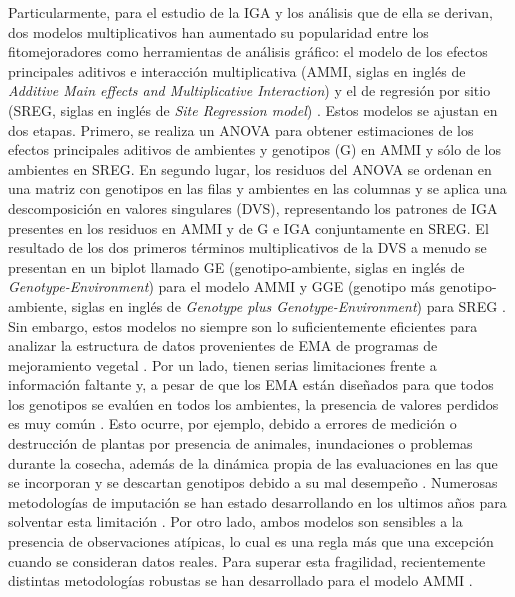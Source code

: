 Particularmente, para el estudio de la IGA y los análisis que de ella se derivan, dos modelos multiplicativos han aumentado su popularidad entre los fitomejoradores como herramientas de análisis gráfico: el modelo de los efectos principales aditivos e interacción multiplicativa (AMMI, siglas en inglés de \emph{Additive Main effects and Multiplicative Interaction}) \citep{Gauch1988, Gauch1992} y el de regresión por sitio (SREG, siglas en inglés de \emph{Site Regression model}) \citep{Corneliusetal1996, CrossaCornelius1997}. Estos modelos se ajustan en dos etapas. Primero, se realiza un ANOVA para obtener estimaciones de los efectos principales aditivos de ambientes y genotipos (G) en AMMI y sólo de los ambientes en SREG. En segundo lugar, los residuos del ANOVA se ordenan en una matriz con genotipos en las filas y ambientes en las columnas y se aplica una descomposición en valores singulares (DVS), representando los patrones de IGA presentes en los residuos en AMMI y de G e IGA conjuntamente en SREG. El resultado de los dos primeros términos multiplicativos de la DVS a menudo se presentan en un biplot llamado GE (genotipo-ambiente, siglas en inglés de \emph{Genotype-Environment}) para el modelo AMMI \citep{Zobel1988} y GGE (genotipo más genotipo-ambiente, siglas en inglés de \emph{Genotype plus Genotype-Environment}) para SREG \citep{Yanetal2000}. Sin embargo, estos modelos no siempre son lo suficientemente eficientes para analizar la estructura de datos provenientes de EMA de programas de mejoramiento vegetal \citep{deOliveira2016, Jarquin2016, Hadaschetal2018}. Por un lado, tienen serias limitaciones frente a información faltante y, a pesar de que los EMA están diseñados para que todos los genotipos se evalúen en todos los ambientes, la presencia de valores perdidos es muy común \citep{Woyann2017, Aguate2019}. Esto ocurre, por ejemplo, debido a errores de medición o destrucción de plantas por presencia de animales, inundaciones o problemas durante la cosecha, además de la dinámica propia de las evaluaciones en las que se incorporan y se descartan genotipos debido a su mal desempeño \citep{HillRosenberg1985}. Numerosas metodologías de imputación se han estado desarrollando en los ultimos años para solventar esta limitación \citep{Alarconetal2010, Alarconetal2014, JosseHusson2016, Alarconetal2020}. Por otro lado, ambos modelos son sensibles a la presencia de observaciones atípicas, lo cual es una regla más que una excepción cuando se consideran datos reales. Para superar esta fragilidad, recientemente distintas metodologías robustas se han desarrollado para el modelo AMMI \citep{Rodriguesetal2016}. 

